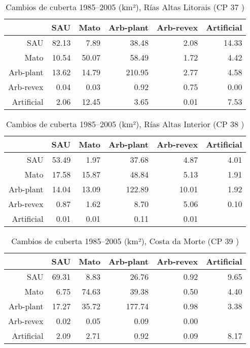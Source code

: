 \begin{table}[p]
\centering
\caption{Cambios de cuberta 1985--2005 (km²), Rías Altas Litorais (CP 37 )} 
\label{TaboaContinxCP37}
\begin{tabular}{rrrrrr}
  \hline
 & SAU & Mato & Arb-plant & Arb-revex & Artificial \\ 
  \hline
SAU & 82.13 & 7.89 & 38.48 & 2.08 & 14.33 \\ 
  Mato & 10.54 & 50.07 & 58.49 & 1.72 & 4.42 \\ 
  Arb-plant & 13.62 & 14.79 & 210.95 & 2.77 & 4.58 \\ 
  Arb-revex & 0.04 & 0.03 & 0.92 & 0.75 & 0.00 \\ 
  Artificial & 2.06 & 12.45 & 3.65 & 0.01 & 7.53 \\ 
   \hline
\end{tabular}
\end{table}
\begin{table}[p]
\centering
\caption{Cambios de cuberta 1985--2005 (km²), Rías Altas Interior (CP 38 )} 
\label{TaboaContinxCP38}
\begin{tabular}{rrrrrr}
  \hline
 & SAU & Mato & Arb-plant & Arb-revex & Artificial \\ 
  \hline
SAU & 53.49 & 1.97 & 37.68 & 4.87 & 4.01 \\ 
  Mato & 17.58 & 15.87 & 48.84 & 5.13 & 1.91 \\ 
  Arb-plant & 14.04 & 13.09 & 122.89 & 10.01 & 1.92 \\ 
  Arb-revex & 0.87 & 1.62 & 8.70 & 5.06 & 0.10 \\ 
  Artificial & 0.01 & 0.01 & 0.11 & 0.01 &  \\ 
   \hline
\end{tabular}
\end{table}
\begin{table}[p]
\centering
\caption{Cambios de cuberta 1985--2005 (km²), Costa da Morte (CP 39 )} 
\label{TaboaContinxCP39}
\begin{tabular}{rrrrrr}
  \hline
 & SAU & Mato & Arb-plant & Arb-revex & Artificial \\ 
  \hline
SAU & 69.31 & 8.83 & 26.76 & 0.92 & 9.65 \\ 
  Mato & 6.75 & 74.63 & 39.38 & 0.50 & 4.40 \\ 
  Arb-plant & 17.27 & 35.72 & 177.74 & 0.98 & 3.38 \\ 
  Arb-revex & 0.02 & 0.05 & 0.09 & 0.00 &  \\ 
  Artificial & 2.09 & 2.71 & 0.92 & 0.09 & 8.17 \\ 
   \hline
\end{tabular}
\end{table}
